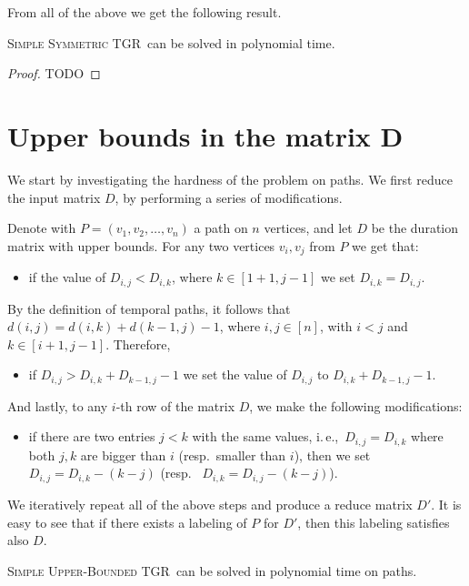 \documentclass[a4paper,UKenglish,cleveref, autoref, thm-restate]{lipics-v2021}
\newcommand{\ie}{i.\,e.,\ }
\newcommand{\deltaSymExact}{\textsc{Simple Symmetric TGR}}
\newcommand{\deltaUpperBound}{\textsc{Simple Upper-Bounded TGR}}
\begin{document}
From all of the above we get the following result.
\begin{theorem}
	\deltaSymExact\ can be solved in polynomial time.
\end{theorem}

\begin{proof}
	TODO
\end{proof}

\section{Upper bounds in the matrix D}
We start by investigating the hardness of the problem on paths.
We first reduce the input matrix $D$, by performing a series of modifications.

Denote with $P = (v_1, v_2, \dots, v_n)$ a path on $n$ vertices,
and let $D$ be the duration matrix with upper bounds.
For any two vertices $v_i, v_j$ from $P$ we get that:
\begin{itemize}
	\item if the value of $D_{i,j} < D_{i,k}$, where $k \in [1+1,j-1]$
	we set $D_{i,k} = D_{i,j}$.
\end{itemize}
%
By the definition of temporal paths, it follows that $d(i,j) = d(i,k) + d(k-1, j) - 1$, where $i,j \in [n]$, with $i<j$ and $k \in [i+1,j-1]$.
Therefore,
\begin{itemize}
	\item if $D_{i,j} > D_{i,k} + D_{k-1,j} -1$ we set the value of $D_{i,j}$ to $D_{i,k} + D_{k-1,j} -1$. 
\end{itemize}
%
And lastly, to any $i$-th row of the matrix $D$, we make the following modifications:
\begin{itemize}
	\item if there are two entries $j< k$ with the same values, \ie $D_{i,j} = D_{i,k}$ where both $j,k$ are bigger than $i$ (resp.~smaller than $i$),
	then we set $D_{i,j} = D_{i,k} - (k-j)$ (resp.~ $D_{i,k} = D_{i,j} - (k-j)$).
\end{itemize}
We iteratively repeat all of the above steps and produce a reduce matrix $D'$.
It is easy to see that if there exists a labeling of $P$ for $D'$, then this labeling satisfies also $D$. 

\begin{theorem}
	\deltaUpperBound\ can be solved in polynomial time on paths.
\end{theorem}
\end{document}
